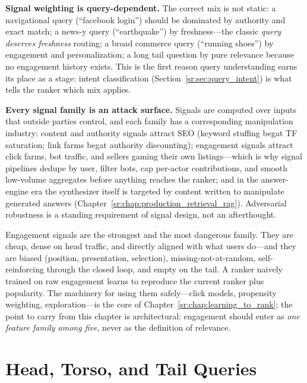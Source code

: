 \textbf{Signal weighting is query-dependent.} The correct mix is not static: a navigational query (``facebook login'') should be dominated by authority and exact match; a news-y query (``earthquake'') by freshness---the classic \textit{query deserves freshness} routing; a broad commerce query (``running shoes'') by engagement and personalization; a long tail question by pure relevance because no engagement history exists. This is the first reason query understanding earns its place as a stage: intent classification (Section~\ref{sr:sec:query_intent}) is what tells the ranker which mix applies.

\textbf{Every signal family is an attack surface.} Signals are computed over inputs that outside parties control, and each family has a corresponding manipulation industry: content and authority signals attract SEO (keyword stuffing begat TF saturation; link farms begat authority discounting); engagement signals attract click farms, bot traffic, and sellers gaming their own listings---which is why signal pipelines dedupe by user, filter bots, cap per-actor contributions, and smooth low-volume aggregates before anything reaches the ranker; and in the answer-engine era the synthesizer itself is targeted by content written to manipulate generated answers (Chapter~\ref{sr:chap:production_retrieval_rag}). Adversarial robustness is a standing requirement of signal design, not an afterthought.

\begin{warningbox}
Engagement signals are the strongest and the most dangerous family. They are cheap, dense on head traffic, and directly aligned with what users do---and they are biased (position, presentation, selection), missing-not-at-random, self-reinforcing through the closed loop, and empty on the tail. A ranker naively trained on raw engagement learns to reproduce the current ranker plus popularity. The machinery for using them safely---click models, propensity weighting, exploration---is the core of Chapter~\ref{sr:chap:learning_to_rank}; the point to carry from this chapter is architectural: engagement should enter as \textit{one feature family among five}, never as the definition of relevance.
\end{warningbox}

\section{Head, Torso, and Tail Queries}
\label{sr:sec:head_torso_tail}

